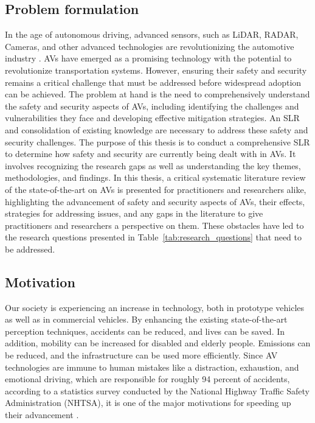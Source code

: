 \documentclass[a4paper,12pt]{article}
\begin{document}
\subsection{Problem formulation}
\hspace{5mm} In the age of autonomous driving, advanced sensors, such as LiDAR, RADAR, Cameras, and other advanced technologies are revolutionizing the automotive industry \cite{article8}. AVs have emerged as a promising technology with the potential to revolutionize transportation systems. However, ensuring their safety and security remains a critical challenge that must be addressed before widespread adoption can be achieved. The problem at hand is the need to comprehensively understand the safety and security aspects of AVs, including identifying the challenges and vulnerabilities they face and developing effective mitigation strategies. An SLR and consolidation of existing knowledge are necessary to address these safety and security challenges. The purpose of this thesis is to conduct a comprehensive SLR to determine how safety and security are currently being dealt with in AVs. It involves recognizing the research gaps as well as understanding the key themes, methodologies, and findings. In this thesis, a critical systematic literature review of the state-of-the-art on AVs is presented for practitioners and researchers alike, highlighting the advancement of safety and security aspects of AVs, their effects, strategies for addressing issues, and any gaps in the literature to give practitioners and researchers a perspective on them. These obstacles have led to the research questions presented in Table~\ref{tab:research_questions} that need to be addressed.


\subsection{Motivation}
\label{sec:motivation}
\hspace{5mm} Our society is experiencing an increase in technology, both in prototype vehicles as well as in commercial vehicles. By enhancing the existing state-of-the-art perception techniques, accidents can be reduced, and lives can be saved. In addition, mobility can be increased for disabled and elderly people. Emissions can be reduced, and the infrastructure can be used more efficiently. Since AV technologies are immune to human mistakes like a distraction, exhaustion, and emotional driving, which are responsible for roughly 94 percent of accidents, according to a statistics survey conducted by the National Highway Traffic Safety Administration (NHTSA), it is one of the major motivations for speeding up their advancement \cite{article9}.
\end{document}

